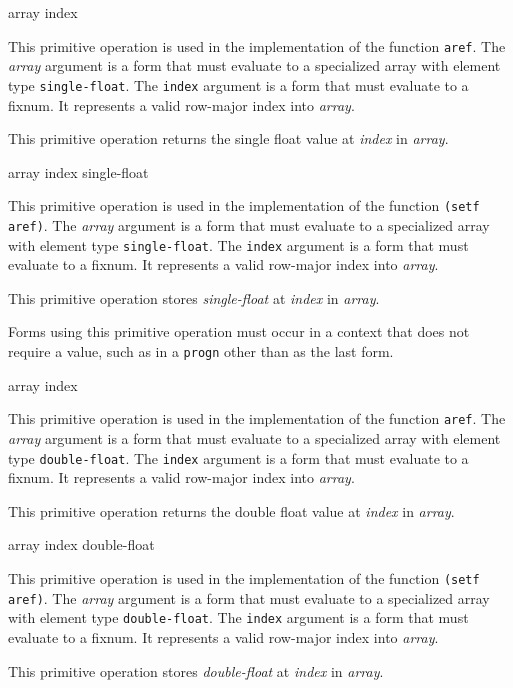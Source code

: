  {array index}

This primitive operation is used in the implementation of the
\commonlisp{} function \texttt{aref}.  The \textit{array} argument is
a form that must evaluate to a specialized array with element type
\texttt{single-float}.  The \texttt{index} argument is a form that
must evaluate to a fixnum.  It represents a valid row-major index into
\textit{array}.

This primitive operation returns the single float value at
\textit{index} in \textit{array}.

 {array index single-float}

This primitive operation is used in the implementation of the
\commonlisp{} function \texttt{(setf aref)}.  The \textit{array}
argument is a form that must evaluate to a specialized array with
element type \texttt{single-float}.  The \texttt{index} argument is a
form that must evaluate to a fixnum.  It represents a valid row-major
index into \textit{array}.

This primitive operation stores \textit{single-float} at
\textit{index} in \textit{array}.

Forms using this primitive operation must occur in a context that does
not require a value, such as in a \texttt{progn} other than as the
last form.

 {array index}

This primitive operation is used in the implementation of the
\commonlisp{} function \texttt{aref}.  The \textit{array} argument is
a form that must evaluate to a specialized array with element type
\texttt{double-float}.  The \texttt{index} argument is a form that must
evaluate to a fixnum.  It represents a valid row-major index into
\textit{array}.

This primitive operation returns the double float value at
\textit{index} in \textit{array}.

 {array index double-float}

This primitive operation is used in the implementation of the
\commonlisp{} function \texttt{(setf aref)}.  The \textit{array}
argument is a form that must evaluate to a specialized array with
element type \texttt{double-float}.  The \texttt{index} argument is a
form that must evaluate to a fixnum.  It represents a valid row-major
index into \textit{array}.

This primitive operation stores \textit{double-float} at \textit{index}
in \textit{array}.

